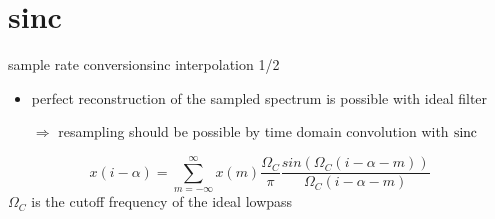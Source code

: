         \section{sinc}
	\begin{frame}{sample rate conversion}{sinc interpolation 1/2}
        \begin{itemize}
            \item   perfect reconstruction of the sampled spectrum is possible with ideal filter
            \item   [$\Rightarrow$] resampling should be possible by time domain convolution with $\operatorname*{sinc}$
        \end{itemize}
            \pause
            \begin{equation*}
                x(i-\alpha) = \sum\limits_{m=-\infty}^{\infty}x(m)\frac{\Omega_C}{\pi}\frac{sin\left(\Omega_C(i-\alpha-m)\right)}{\Omega_C(i-\alpha-m)}
            \end{equation*}
            $\Omega_C$ is the cutoff frequency of the  ideal lowpass
    \end{frame}
